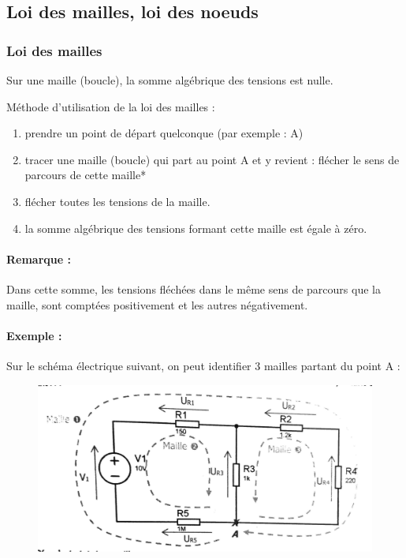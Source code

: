 \documentclass[a4paper,10pt]{article}
\begin{document}
\subsection{Loi des mailles, loi des noeuds}

\subsubsection{Loi des mailles}

Sur une maille (boucle), la somme algébrique des tensions est nulle.

Méthode d'utilisation de la loi des mailles : 
\begin{enumerate}
 \item prendre un point de départ quelconque (par exemple : A)
 \item tracer une maille (boucle) qui part au point A et y revient : flécher le sens de parcours de cette maille*
 \item flécher toutes les tensions de la maille.
 \item la somme algébrique des tensions formant cette maille est égale à zéro.
\end{enumerate}

\paragraph{Remarque :}
Dans cette somme, les tensions fléchées dans le même sens de parcours que la maille, sont comptées positivement et les autres négativement.

\paragraph{Exemple :}
Sur le schéma électrique suivant, on peut identifier 3 mailles partant du point A :

\begin{figure}[h]
 \begin{center}
  \includegraphics[width=\textwidth]{loidesmailles}
 \end{center}
\end{figure}
\end{document}
